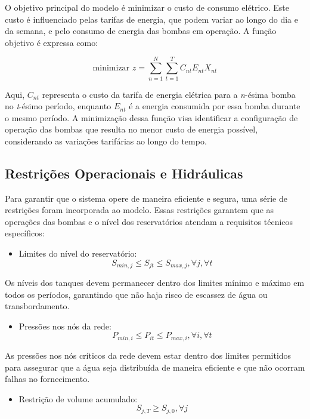 \documentclass[12pt,a4paper,oneside,linenumbers=off,latinmodern=off,timesnews=off,english,spanish]{rctart-class/rctart}
\begin{document}
O objetivo principal do modelo é minimizar o custo de consumo elétrico. Este custo é influenciado pelas tarifas de energia, que podem variar ao longo do dia e da semana, e pelo consumo de energia das bombas em operação. A função objetivo é expressa como:

\[
\text{minimizar } z = \sum_{n=1}^{N} \sum_{t=1}^{T} C_{nt} E_{nt} X_{nt}
\]

Aqui, \(C_{nt}\) representa o custo da tarifa de energia elétrica para a \textit{n}-ésima bomba no \textit{t}-ésimo período, enquanto \(E_{nt}\) é a energia consumida por essa bomba durante o mesmo período. A minimização dessa função visa identificar a configuração de operação das bombas que resulta no menor custo de energia possível, considerando as variações tarifárias ao longo do tempo.

\subsection{Restrições Operacionais e Hidráulicas}

Para garantir que o sistema opere de maneira eficiente e segura, uma série de restrições foram incorporada ao modelo. Essas restrições garantem que as operações das bombas e o nível dos reservatórios atendam a requisitos técnicos específicos:

\begin{itemize}
\item Limites do nível do reservatório:
  \[
  S_{min,j} \leq S_{jt} \leq S_{max,j}, \forall j, \forall t
  \]
\end{itemize}

Os níveis dos tanques devem permanecer dentro dos limites mínimo e máximo em todos os períodos, garantindo que não haja risco de escassez de água ou transbordamento.

\begin{itemize}
\item Pressões nos nós da rede:
  \[
  P_{min,i} \leq P_{it} \leq P_{max,i}, \forall i, \forall t
  \]
\end{itemize}

As pressões nos nós críticos da rede devem estar dentro dos limites permitidos para assegurar que a água seja distribuída de maneira eficiente e que não ocorram falhas no fornecimento.

\begin{itemize}
\item Restrição de volume acumulado:
  \[
  S_{j,T} \geq S_{j,0}, \forall j
  \]
\end{itemize}
\end{document}
